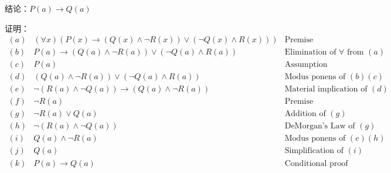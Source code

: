 \documentclass[hyperref, UTF8]{ctexart}
\begin{document}
结论：$P(a) \rightarrow Q(a)$

证明：
\begin{align*}
    (a) & ( \forall x)(P(x) \rightarrow (Q(x) \land \lnot R(x)) \lor (\lnot Q(x) \land R(x))) & \text{Premise} \\
    (b) & P(a) \rightarrow (Q(a) \land \lnot R(a)) \lor (\lnot Q(a) \land R(a)) & \text{Elimination of } \forall \text{ from } (a) \\
    (c) & P(a) & \text{Assumption} \\
    (d) & (Q(a) \land \lnot R(a)) \lor (\lnot Q(a) \land R(a)) & \text{Modus ponens of } (b)(c) \\
    (e) & \lnot (R(a) \land \lnot Q(a)) \rightarrow (Q(a) \land \lnot R(a)) & \text{Material implication of } (d) \\
    (f) & \lnot R(a) & \text{Premise} \\
    (g) & \lnot R(a) \lor Q(a) & \text{Addition of } (g) \\
    (h) & \lnot (R(a) \land \lnot Q(a)) & \text{DeMorgan's Law of } (g) \\
    (i) & Q(a) \land \lnot R(a) & \text{Modus ponens of } (e)(h) \\
    (j) & Q(a) & \text{Simplification of } (i) \\
    (k) & P(a) \rightarrow Q(a) & \text{Conditional proof}
\end{align*} 
\end{document}
